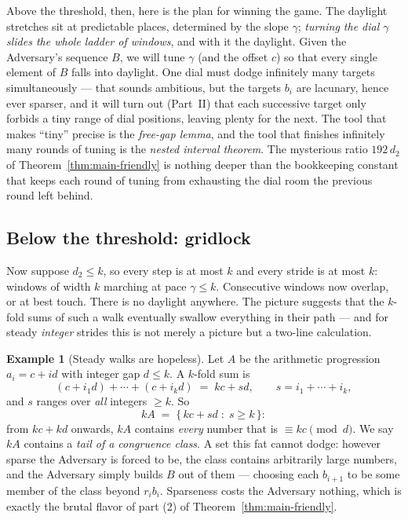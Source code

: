 \documentclass[11pt,reqno]{amsart}
\theoremstyle{plain}
\theoremstyle{definition}
\newtheorem{example}[theorem]{Example}
\theoremstyle{remark}
\begin{document}
Above the threshold, then, here is the plan for winning the game. The daylight
stretches sit at predictable places, determined by the slope $\gamma$; \emph{turning
the dial $\gamma$ slides the whole ladder of windows}, and with it the daylight. Given
the Adversary's sequence $B$, we will tune $\gamma$ (and the offset $c$) so that every
single element of $B$ falls into daylight. One dial must dodge infinitely many targets
simultaneously --- that sounds ambitious, but the targets $b_i$ are lacunary, hence
ever sparser, and it will turn out (Part~II) that each successive target only forbids
a tiny range of dial positions, leaving plenty for the next. The tool that makes
``tiny'' precise is the \emph{free-gap lemma}, and the tool that finishes infinitely
many rounds of tuning is the \emph{nested interval theorem}. The mysterious ratio
$192\,d_2$ of Theorem~\ref{thm:main-friendly} is nothing deeper than the bookkeeping
constant that keeps each round of tuning from exhausting the dial room the previous
round left behind.

\subsection{Below the threshold: gridlock}\label{sec:gridlock}

Now suppose $d_2 \le k$, so every step is at most $k$ and every stride is at most $k$:
windows of width $k$ marching at pace $\gamma \le k$. Consecutive windows now overlap,
or at best touch. There is no daylight anywhere. The picture suggests that the
$k$-fold sums of such a walk eventually swallow everything in their path --- and for
steady \emph{integer} strides this is not merely a picture but a two-line calculation.

\begin{example}[Steady walks are hopeless]\label{ex:steady-hopeless}
Let $A$ be the arithmetic progression $a_i = c + i d$ with integer gap $d \le k$. A
$k$-fold sum is
\[
  (c + i_1 d) + \cdots + (c + i_k d) \;=\; kc + s d, \qquad s = i_1 + \cdots + i_k,
\]
and $s$ ranges over \emph{all} integers $\ge k$. So
\[
  kA \;=\; \{\, kc + sd \;:\; s \ge k \,\}:
\]
from $kc + kd$ onwards, $kA$ contains \emph{every} number that is $\equiv kc
\pmod d$. We say $kA$ contains a \emph{tail of a congruence class}. A set this fat
cannot dodge: however sparse the Adversary is forced to be, the class contains
arbitrarily large numbers, and the Adversary simply builds $B$ out of them ---
choosing each $b_{i+1}$ to be some member of the class beyond $r_i b_i$. Sparseness
costs the Adversary nothing, which is exactly the brutal flavor of part (2) of
Theorem~\ref{thm:main-friendly}.
\end{example}
\end{document}
